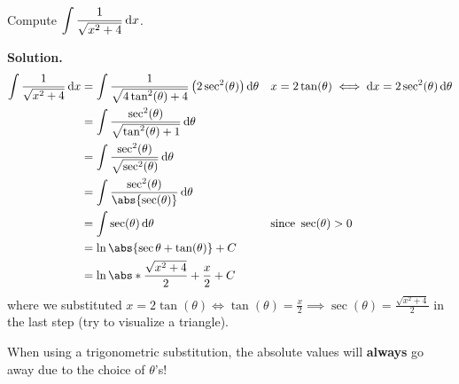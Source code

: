 \begin{Example}{}{}
    Compute $ \displaystyle   \int \frac{1}{\sqrt{x^2+4}} \odif{x} $.

    \textbf{Solution.}
    \begin{align*}
        \int \frac{1}{\sqrt{x^2+4}} \odif{x}
         & =\int \frac{1}{\sqrt{4\tan^2(\theta)+4}} \left(2\sec^2(\theta)\right) \odif{\theta}
         &                                                                                     & x=2\tan(\theta)\iff \odif{x}=2\sec^2(\theta)\odif{\theta}                               \\
         & =\int \frac{\sec^2(\theta)}{\sqrt{\tan^2(\theta)+1}} \odif{\theta}                                                                                                            \\
         & =\int \frac{\sec^2(\theta)}{\sqrt{\sec^2(\theta)}} \odif{\theta}                                                                                                              \\
         & =\int \frac{\sec^2(\theta)}{\abs{\sec(\theta)}} \odif{\theta}                                                                                                                 \\
         & =\int \sec(\theta)\odif{\theta}                                                     &                                                           & \text{since }\sec(\theta)>0 \\
         & =\ln\abs{\sec{\theta}+\tan(\theta)}+C                                               &                                                                                         \\
         & =\ln\abs*{\frac{\sqrt{x^2+4}}{2}+\frac{x}{2}}+C
    \end{align*}
    where we substituted $
        \displaystyle x=2\tan(\theta)\iff \tan(\theta)=\frac{x}{2}\implies
        \sec(\theta)=\frac{\sqrt{x^2+4}}{2} $ in the last step (try to visualize a triangle).
\end{Example}

\begin{Remark}{}{}
    When using a trigonometric substitution, the absolute values will \textbf{always}
    go away due to the choice of $ \theta $'s!
\end{Remark}

